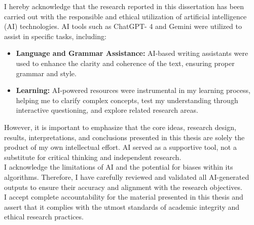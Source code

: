 I hereby acknowledge that the research reported in this dissertation has been carried out with the responsible and ethical utilization of artificial intelligence (AI) technologies. AI tools such as ChatGPT- 4 and Gemini were utilized to assist in specific tasks, including:


\begin{itemize}
    \item \textbf{Language and Grammar Assistance:} AI-based writing assistants were used to enhance the clarity and coherence of the text, ensuring proper grammar and style.
    \item \textbf{Learning:} AI-powered resources were instrumental in my learning process, helping me to clarify complex concepts, test my understanding through interactive questioning, and explore related research areas.
\end{itemize}


\noindent However, it is important to emphasize that the core ideas, research design, results, interpretations, and conclusions presented in this thesis are solely the product of my own intellectual effort. AI served as a supportive tool, not a substitute for critical thinking and independent research.\\

\noindent I acknowledge the limitations of AI and the potential for biases within its algorithms. Therefore, I have carefully reviewed and validated all AI-generated outputs to ensure their accuracy and alignment with the research objectives.\\

\noindent I accept complete accountability for the material presented in this thesis and assert that it complies with the utmost standards of academic integrity and ethical research practices.
